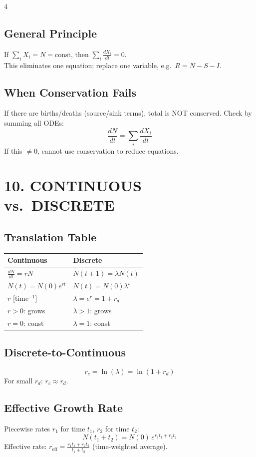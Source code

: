 \documentclass[8pt,landscape]{article}
\begin{document}
\begin{multicols}{4}
\subsection{General Principle}
If $\sum_i X_i = N = \text{const}$, then $\sum_i \frac{dX_i}{dt} = 0$.\\
This eliminates one equation; replace one variable, e.g.\ $R = N - S - I$.

\subsection{When Conservation Fails}
If there are births/deaths (source/sink terms), total is NOT conserved. Check by summing all ODEs:
\[
\frac{dN}{dt} = \sum_i \frac{dX_i}{dt}
\]
If this $\neq 0$, cannot use conservation to reduce equations.

\section{10. CONTINUOUS vs.\ DISCRETE}

\subsection{Translation Table}
\begin{tabular}{ll}
\toprule
Continuous & Discrete \\
\midrule
$\frac{dN}{dt} = rN$ & $N(t+1) = \lambda N(t)$ \\
$N(t) = N(0)e^{rt}$ & $N(t) = N(0)\lambda^t$ \\
$r$ [time$^{-1}$] & $\lambda = e^r = 1 + r_d$ \\
$r > 0$: grows & $\lambda > 1$: grows \\
$r = 0$: const & $\lambda = 1$: const \\
\bottomrule
\end{tabular}

\subsection{Discrete-to-Continuous}
\[
r_c = \ln(\lambda) = \ln(1 + r_d)
\]
For small $r_d$: $r_c \approx r_d$.

\subsection{Effective Growth Rate}
Piecewise rates $r_1$ for time $t_1$, $r_2$ for time $t_2$:
\[
N(t_1+t_2) = N(0)\,e^{r_1 t_1 + r_2 t_2}
\]
Effective rate: $r_{\text{eff}} = \frac{r_1 t_1 + r_2 t_2}{t_1 + t_2}$ (time-weighted average).


\end{multicols}
\end{document}
